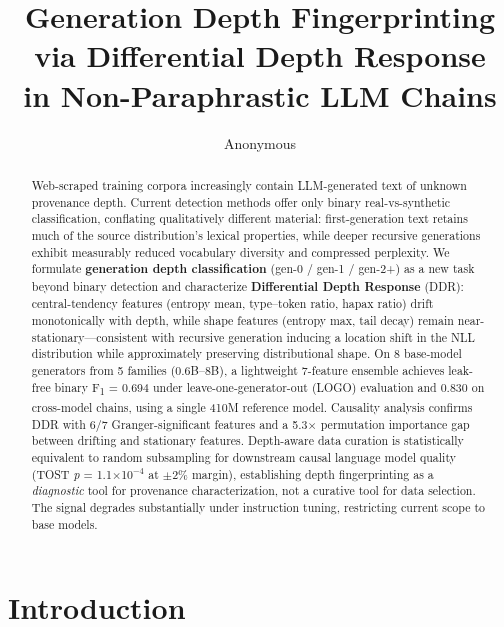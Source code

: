 \documentclass[11pt,a4paper]{article}
\title{Generation Depth Fingerprinting via Differential Depth Response\\in Non-Paraphrastic LLM Chains}
\author{Anonymous}
\date{}
\newcommand{\fone}{F\textsubscript{1}}
\newcommand{\pval}{\textit{p}}
\begin{document}
\maketitle

\begin{abstract}
Web-scraped training corpora increasingly contain LLM-generated text of unknown provenance depth.
Current detection methods offer only binary real-vs-synthetic classification, conflating qualitatively different material:
first-generation text retains much of the source distribution's lexical properties, while deeper recursive generations exhibit measurably reduced vocabulary diversity and compressed perplexity.
We formulate \textbf{generation depth classification} (gen-0 / gen-1 / gen-2+) as a new task beyond binary detection
and characterize \textbf{Differential Depth Response} (DDR):
central-tendency features (entropy mean, type--token ratio, hapax ratio) drift monotonically with depth,
while shape features (entropy max, tail decay) remain near-stationary---consistent with recursive generation inducing a location shift in the NLL distribution while approximately preserving distributional shape.
On 8 base-model generators from 5 families (0.6B--8B), a lightweight 7-feature ensemble achieves
leak-free binary \fone{} = 0.694 under leave-one-generator-out (LOGO) evaluation
and 0.830 on cross-model chains, using a single 410M reference model.
Causality analysis confirms DDR with 6/7 Granger-significant features and a 5.3$\times$ permutation importance gap between drifting and stationary features.
Depth-aware data curation is statistically equivalent to random subsampling for downstream causal language model quality
(TOST \pval{} = 1.1$\times$10$^{-4}$ at $\pm$2\% margin),
establishing depth fingerprinting as a \emph{diagnostic} tool for provenance characterization, not a curative tool for data selection.
The signal degrades substantially under instruction tuning, restricting current scope to base models.
\end{abstract}

\section{Introduction}
\label{sec:intro}
\end{document}
